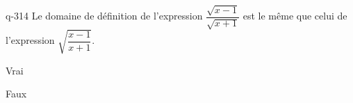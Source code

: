 \begin{truefalse}{q-314}
Le domaine de définition de l'expression $\dfrac{\sqrt{x-1}}{\sqrt{x+1}}$ est le même que celui de l'expression $\sqrt{\dfrac{x-1}{x+1}}$.
\item Vrai
\item* Faux
\end{truefalse}

